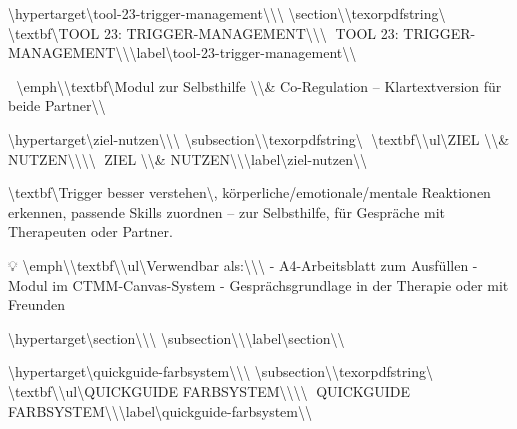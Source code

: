 \textbackslash{}hypertarget\textbackslash{}{tool-23-trigger-management\textbackslash{}}\textbackslash{}{\textbackslash{}%
\textbackslash{}section\textbackslash{}{\textbackslash{}texorpdfstring\textbackslash{}{📄 \textbackslash{}textbf\textbackslash{}{TOOL 23: TRIGGER-MANAGEMENT\textbackslash{}}\textbackslash{}}\textbackslash{}{📄 TOOL 23: TRIGGER-MANAGEMENT\textbackslash{}}\textbackslash{}}\textbackslash{}label\textbackslash{}{tool-23-trigger-management\textbackslash{}}\textbackslash{}}

🧩 \textbackslash{}emph\textbackslash{}{\textbackslash{}textbf\textbackslash{}{Modul zur Selbsthilfe \textbackslash{}\textbackslash{}& Co-Regulation -- Klartextversion für beide Partner\textbackslash{}}\textbackslash{}}

\textbackslash{}hypertarget\textbackslash{}{ziel-nutzen\textbackslash{}}\textbackslash{}{\textbackslash{}%
\textbackslash{}subsection\textbackslash{}{\textbackslash{}texorpdfstring\textbackslash{}{🎯 \textbackslash{}textbf\textbackslash{}{\textbackslash{}ul\textbackslash{}{ZIEL \textbackslash{}\textbackslash{}& NUTZEN\textbackslash{}}\textbackslash{}}\textbackslash{}}\textbackslash{}{🎯 ZIEL \textbackslash{}\textbackslash{}& NUTZEN\textbackslash{}}\textbackslash{}}\textbackslash{}label\textbackslash{}{ziel-nutzen\textbackslash{}}\textbackslash{}}

\textbackslash{}textbf\textbackslash{}{Trigger besser verstehen\textbackslash{}}, körperliche/emotionale/mentale Reaktionen erkennen, passende Skills zuordnen -- zur Selbsthilfe, für Gespräche mit Therapeuten oder Partner.

💡 \textbackslash{}emph\textbackslash{}{\textbackslash{}textbf\textbackslash{}{\textbackslash{}ul\textbackslash{}{Verwendbar als:\textbackslash{}}\textbackslash{}}\textbackslash{}} - A4-Arbeitsblatt zum Ausfüllen - Modul im CTMM-Canvas-System - Gesprächsgrundlage in der Therapie oder mit Freunden

\textbackslash{}hypertarget\textbackslash{}{section\textbackslash{}}\textbackslash{}{\textbackslash{}%
\textbackslash{}subsection\textbackslash{}{\textbackslash{}}\textbackslash{}label\textbackslash{}{section\textbackslash{}}\textbackslash{}}

\textbackslash{}hypertarget\textbackslash{}{quickguide-farbsystem\textbackslash{}}\textbackslash{}{\textbackslash{}%
\textbackslash{}subsection\textbackslash{}{\textbackslash{}texorpdfstring\textbackslash{}{🧭 \textbackslash{}textbf\textbackslash{}{\textbackslash{}ul\textbackslash{}{QUICKGUIDE FARBSYSTEM\textbackslash{}}\textbackslash{}}\textbackslash{}}\textbackslash{}{🧭 QUICKGUIDE FARBSYSTEM\textbackslash{}}\textbackslash{}}\textbackslash{}label\textbackslash{}{quickguide-farbsystem\textbackslash{}}\textbackslash{}}

